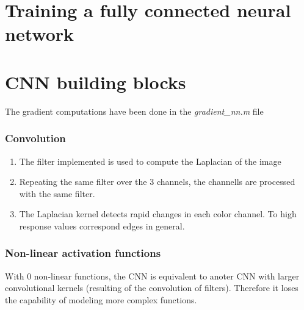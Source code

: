 \documentclass{article}
\begin{document}
\maketitle

\part{Training a fully connected neural network}


\part{CNN building blocks}

The gradient computations have been done in the \textit{gradient\_nn.m} file

\section{Convolution}

\begin{enumerate}
	\item The filter implemented is used to compute the Laplacian of the image
	\item Repeating the same filter over the 3 channels, the channells are processed with the same filter.
	\item The Laplacian kernel detects rapid changes in each color channel. To high response values correspond edges in general.
\end{enumerate}


\section{Non-linear activation functions}


With 0 non-linear functions, the CNN is equivalent to anoter CNN with larger convolutional kernels (resulting of the convolution of filters). Therefore it loses the capability of modeling more complex functions.
\end{document}
